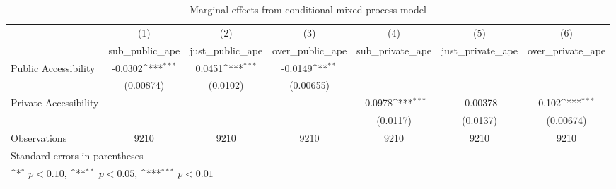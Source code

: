 \begin{table}[htbp]\centering
\def\sym#1{\ifmmode^{#1}\else\(^{#1}\)\fi}
\caption{Marginal effects from conditional mixed process model}
\begin{tabular}{l*{6}{c}}
\toprule
                    &\multicolumn{1}{c}{(1)}&\multicolumn{1}{c}{(2)}&\multicolumn{1}{c}{(3)}&\multicolumn{1}{c}{(4)}&\multicolumn{1}{c}{(5)}&\multicolumn{1}{c}{(6)}\\
                    &\multicolumn{1}{c}{sub\_public\_ape}&\multicolumn{1}{c}{just\_public\_ape}&\multicolumn{1}{c}{over\_public\_ape}&\multicolumn{1}{c}{sub\_private\_ape}&\multicolumn{1}{c}{just\_private\_ape}&\multicolumn{1}{c}{over\_private\_ape}\\
\midrule
Public Accessibility&     -0.0302\sym{***}&      0.0451\sym{***}&     -0.0149\sym{**} &                     &                     &                     \\
                    &   (0.00874)         &    (0.0102)         &   (0.00655)         &                     &                     &                     \\
\addlinespace
Private Accessibility&                     &                     &                     &     -0.0978\sym{***}&    -0.00378         &       0.102\sym{***}\\
                    &                     &                     &                     &    (0.0117)         &    (0.0137)         &   (0.00674)         \\
\midrule
Observations        &        9210         &        9210         &        9210         &        9210         &        9210         &        9210         \\
\bottomrule
\multicolumn{7}{l}{\footnotesize Standard errors in parentheses}\\
\multicolumn{7}{l}{\footnotesize \sym{*} \(p<0.10\), \sym{**} \(p<0.05\), \sym{***} \(p<0.01\)}\\
\end{tabular}
\end{table}
